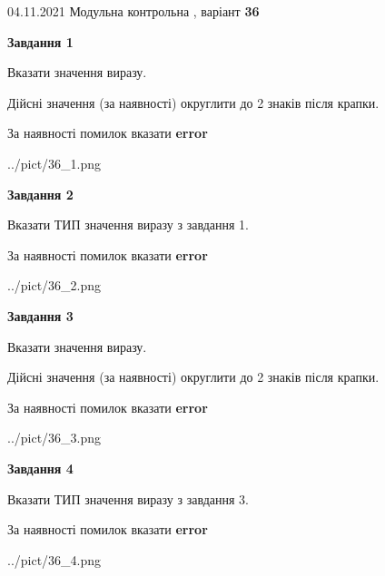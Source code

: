 \documentclass[11pt, ukrainian]{article}
\begin{document}
{04.11.2021 Модульна контрольна , варіант  \No \textbf { 36 }\par}
{
\begin {large}
{\begin {center}\textbf{Завдання 1}\end {center}}\par
Вказати значення виразу. \par
Дійсні значення (за наявності) округлити до 2 знаків після крапки. \par
За наявності помилок вказати \textbf{error}

\begin{center}
	{../pict/36_1.png}
\end{center}
\newpage

{\begin {center}\textbf{Завдання 2}\end {center}}\par
Вказати ТИП значення виразу з завдання 1. \par
За наявності помилок вказати \textbf{error}

\begin{center}
	{../pict/36_2.png}
\end{center}
\newpage

{\begin {center}\textbf{Завдання 3}\end {center}}\par
Вказати значення виразу. \par
Дійсні значення (за наявності) округлити до 2 знаків після крапки. \par
За наявності помилок вказати \textbf{error}

\begin{center}
	{../pict/36_3.png}
\end{center}
\newpage

{\begin {center}\textbf{Завдання 4}\end {center}}\par
Вказати ТИП значення виразу з завдання 3. \par
За наявності помилок вказати \textbf{error}

\begin{center}
	{../pict/36_4.png}
\end{center}
\newpage


\end{large}}
\end{document}
